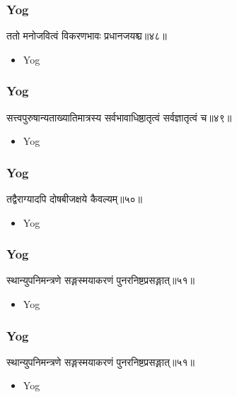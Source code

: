 \begin{frame}[fragile]\frametitle{Yog}
\begin{sanskrit}
ततो मनोजवित्वं विकरणभावः प्रधानजयश्च॥४८॥
\end{sanskrit}
	\begin{itemize}
	\item Yog 
	\end{itemize}
\end{frame}


\begin{frame}[fragile]\frametitle{Yog}
\begin{sanskrit}
सत्त्वपुरुषान्यताख्यातिमात्रस्य सर्वभावाधिष्ठातृत्वं सर्वज्ञातृत्वं च॥४९॥
\end{sanskrit}
	\begin{itemize}
	\item Yog 
	\end{itemize}
\end{frame}


\begin{frame}[fragile]\frametitle{Yog}
\begin{sanskrit}
तद्वैराग्यादपि दोषबीजक्षये कैवल्यम्॥५०॥
\end{sanskrit}
	\begin{itemize}
	\item Yog 
	\end{itemize}
\end{frame}


\begin{frame}[fragile]\frametitle{Yog}
\begin{sanskrit}
स्थान्युपनिमन्त्रणे सङ्गस्मयाकरणं पुनरनिष्टप्रसङ्गात्॥५१॥
\end{sanskrit}
	\begin{itemize}
	\item Yog 
	\end{itemize}
\end{frame}

\begin{frame}[fragile]\frametitle{Yog}
\begin{sanskrit}
स्थान्युपनिमन्त्रणे सङ्गस्मयाकरणं पुनरनिष्टप्रसङ्गात्॥५१॥
\end{sanskrit}
	\begin{itemize}
	\item Yog 
	\end{itemize}
\end{frame}

